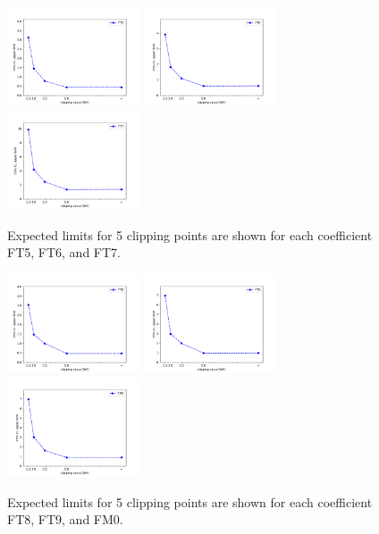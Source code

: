 \begin{figure}[ht]
    \centering
    	\includegraphics[width=0.35\textwidth]{figures/aQGC/ClippedFT5.pdf}
    	\includegraphics[width=0.35\textwidth]{figures/aQGC/ClippedFT6.pdf}
    	\includegraphics[width=0.35\textwidth]{figures/aQGC/ClippedFT7.pdf}
        \caption{Expected limits for 5 clipping points are shown for each coefficient FT5, FT6, and FT7.}
\end{figure}

\begin{figure}[ht]
    \centering
    	\includegraphics[width=0.35\textwidth]{figures/aQGC/ClippedFT8.pdf}
    	\includegraphics[width=0.35\textwidth]{figures/aQGC/ClippedFT9.pdf}
    	\includegraphics[width=0.35\textwidth]{figures/aQGC/ClippedFM0.pdf}
        \caption{Expected limits for 5 clipping points are shown for each coefficient FT8, FT9, and FM0.}
\end{figure}


